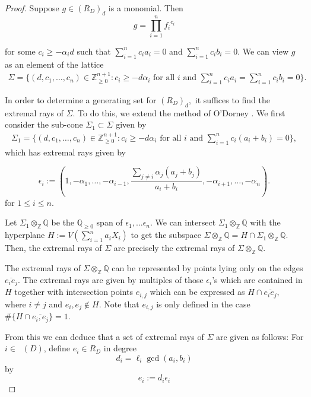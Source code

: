 \documentclass{amsart}
\theoremstyle{plain}
\theoremstyle{definition}
\theoremstyle{remark}
\numberwithin{equation}{section}
\newcommand\bq{{\mathbb Q}}
\newcommand\bz{{\mathbb Z}}
\newcommand\bida{a}
\newcommand\bidb{b}
\DeclareMathOperator{\Te}{T_=}
\begin{document}
\begin{proof}
Suppose $g
\in (R_D)_d$ is a monomial.
 Then 
\[
	g = \prod_{i = 1}^n {f_i}^{c_i}
\]

\noindent
for some $c_i \ge - \alpha_i d$ such that $\sum_{i=1}^n c_i \bida_i = 0$
and $\sum_{i=1}^n c_i \bidb_i = 0$. We can view $g$ as an element of the
lattice 
\begin{align*}
	\Sigma = \{ (d, c_1, \ldots, c_n) \in \bz_{\geq 0}^{n+1} : c_i \ge - d
\alpha_i \text{ for all }i \text{ and }\sum_{i=1}^n c_i \bida_i = \sum_{i =
1}^n c_i \bidb_i = 0 \}.	
\end{align*}

In order to determine a generating
set for $(R_D)_d,$ it suffices to find the extremal rays of $\Sigma.$
To do this, we extend the method of O'Dorney \cite[Theorem 8]{dorney:canonical}. 
We first consider the sub-cone $\Sigma_1 \subset \Sigma$
given by
\begin{align*}
	\Sigma_1 = \{ (d, c_1, \ldots, c_n) \in \bz_{\geq 0}^{n+1} : c_i \ge -
d \alpha_i \text{ for all }i \text{ and }\sum_{i=1}^n c_i (\bida_i+\bidb_i) = 0
\},
\end{align*}
which
has extremal rays given by
 
\[
	\epsilon_i := (1, -\alpha_1, \ldots, -\alpha_{i-1}, \frac{\sum_{j \ne i}
	\alpha_j (\bida_j + \bidb_j)}{\bida_i + \bidb_i}, -\alpha_{i + 1},
	\ldots, -\alpha_n).
\]
for $1 \leq i \leq n$.

Let $\Sigma_1 \otimes_\bz \bq$ be the $\bq_{\ge 0}$ span of $\epsilon_1, \ldots \epsilon_n$.
We can intersect $\Sigma_1 \otimes_\bz \bq$ with the hyperplane $H :=
V(\sum_{i=1}^n \bida_i X_i)$  to get the subspace $\Sigma \otimes_\bz \bq = H \cap \Sigma_1
\otimes_\bz \bq$.  Then, the extremal rays of $\Sigma$ are precisely the extremal 
rays of $\Sigma \otimes_\bz \bq$.

The extremal rays of $\Sigma \otimes_\bz \bq$ can be represented by points
lying only on the edges 
$\overline{e_i e_j}$.
The extremal rays are given by multiples of those $\epsilon_i$'s
which are contained in $H$ together with intersection points $e_{i, j}$ which
can be expressed as $H \cap \overline{e_i e_j},$ where $i \neq j$ and $e_i,
e_j \notin H$. Note that $e_{i,j}$ is only defined in the case
$\# \{H \cap \overline{e_i, e_j}\} = 1$.


From this we can deduce that a set of extremal rays of $\Sigma$ are given as follows:
For $i \in \Te(D)$, define $e_i \in R_D$ in degree 
\[
	d_i = \ell_i \gcd(a_i, b_i)
\]
by 
\begin{equation}\label{eqn:epsilon_i}
	e_i := d_i \epsilon_i %
\end{equation}


\end{proof}
\end{document}
